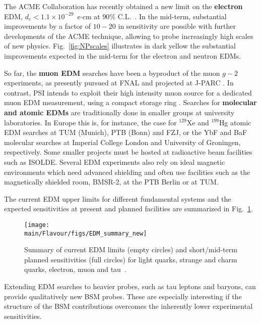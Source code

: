 The ACME Collaboration \cite{Andreev:2018ayy} has recently obtained a new limit on the {\bf electron} EDM, $d_e < 1.1 \times 10^{-29}$~e$\cdot$cm at $90\%$ C.L.~\cite{Andreev:2018ayy}. In the mid-term, 
substantial improvements by a factor of $10-20$ in sensitivity are possible with further developments of the ACME technique, allowing to probe increasingly high scales of new physics. Fig.~\ref{fig:NPscales} illustrates in dark yellow the substantial improvements expected  in the mid-term for the electron and neutron EDMs. 

 So far, the {\bf muon EDM} searches  have been a byproduct of the muon $g-2$ experiments, as presently pursued at FNAL \cite{Chislett:2016jau} and projected at J-PARC \cite{Sato:2017sdn}. In contrast,  PSI intends to exploit their high intensity muon source for a dedicated muon EDM measurement, using a compact storage ring \cite{Crivellin:2018qmi}.   Searches for {\bf molecular and atomic EDMs} are traditionally done in smaller groups at  university laboratories.   In  Europe  this  is,  for  instance,  the  case  for $^{129}$Xe and $^{199}$Hg  atomic EDM searches at TUM (Munich), PTB (Bonn) and FZJ, or the YbF and BaF molecular searches at Imperial College London and University of Groningen, respectively. 
 Some smaller projects  must be hosted at radioactive beam facilities such as ISOLDE. Several EDM experiments also rely on ideal magnetic environments which need advanced shielding  and  often  use  facilities  such as the  magnetically  shielded  room, BMSR-2, at the PTB Berlin or at TUM.


The current EDM upper limits for different fundamental systems and the expected sensitivities at present and planned facilities are summarized in Fig.~\ref{fig:EDM}.


\begin{figure}[t]
\begin{center}
  \texttt{[image: \\main/Flavour/figs/EDM\_summary\_new]}
  \caption{Summary of current EDM limits (empty circles) and short/mid-term  
  planned sensitivities (full circles) for light quarks, strange and charm quarks, electron, muon and tau~\cite{PaulESPP19}.} 
    \label{fig:EDM}
  \end{center}
\end{figure}


Extending EDM searches to heavier probes, such as tau leptons and baryons, can provide qualitatively new BSM probes. These are especially interesting if the structure of the BSM contributions overcomes the inherently lower experimental sensitivities.


